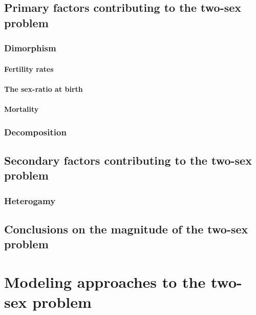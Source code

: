   \section{Primary factors contributing to the two-sex problem}
    \subsection{Dimorphism}
      
      \subsubsection{Fertility rates}
        
      \subsubsection{The sex-ratio at birth}
        
      \subsubsection{Mortality}
        
    \subsection{Decomposition}
       
  \section{Secondary factors contributing to the two-sex problem}
      
    \subsection{Heterogamy}
       
  \section{Conclusions on the magnitude of the two-sex problem}
      
  \chapter{Modeling approaches to the two-sex problem}
    
